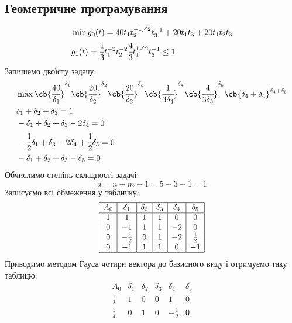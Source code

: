 \subsection{Геометричне програмування}
\begin{tsk}
\begin{eqnarray}
	&\min g_0(t) = 40t_1t_2^{-1\diagup 2} t_3^{-1} + 20t_1t_3 + 20 t_1t_2t_3\\
	&g_1(t) = \cfrac13 t_1^{-2} t_2^{-2} \cfrac43 t_1^{1\diagup 2} t_3^{-1}\leq 1
\end{eqnarray}
Запишемо двоїсту задачу:
\begin{eqnarray}
	&\max \cb{\cfrac{40}{\delta_1}}^{\delta_1} \cb{\cfrac{20}{\delta_2}}^{\delta_2}  \cb{\cfrac{20}{\delta_3}}^{\delta_3} \cb{\cfrac{1}{3\delta_4}}^{\delta_4} \cb{\cfrac{4}{3\delta_5}}^{\delta_5} \cb{\delta_4+\delta_4}^{\delta_4+\delta_5}\\
	&\delta_1+\delta_2+\delta_3 = 1\\
	&-\delta_1 + \delta_2 + \delta_3 - 2\delta_4 = 0\\
	&-\cfrac12 \delta_1 + \delta_3 -2\delta_4+\cfrac12 \delta_5 = 0 \\
	&-\delta_1 +\delta_2 +\delta_3 -\delta_5 = 0 
\end{eqnarray}
Обчислимо степінь складності задачі: 
\begin{equation}
	d = n - m -1 = 5 - 3 - 1 = 1
\end{equation}
Записуємо всі обмеження у табличку:
\begin{equation*}
	\begin{array}{|c|c|c|c|c|c|}
		\hline
		A_0 & \delta_1 & \delta_2 &\delta_3& \delta_4 &\delta_5 \\
		\hline
		1 & 1 & 1 & 1 & 0 & 0 \\
		0 & -1 & 1 & 1 & -2 & 0\\
		0 & -\frac12 & 0 & 1 & - 2 & \frac12 \\
		0 & -1 & 1 & 1 & 0 & -1\\
		\hline
	\end{array}
\end{equation*}
Приводимо методом Гауса чотири вектора до базисного виду і отримуємо таку таблицю:
\begin{equation*}
	\begin{array}{|c|c|c|c|c|c|}
		\hline
		A_0 & \delta_1 & \delta_2 &\delta_3& \delta_4 &\delta_5 \\
		\hline
		\frac12 & 1 & 0 & 0 & 1 & 0 \\
		\frac14 & 0 & 1 & 0 & -\frac12 & 0 \\

\end{array}
\end{equation*}
\end{tsk}
